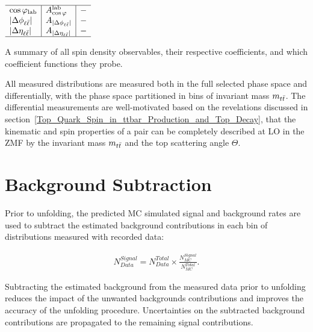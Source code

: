 \begin{table}[htb]
\begin{center}
\begin{adjustbox}{scale=0.85,center}
\begin{math}
\begin{array}{l|l|l}
\hline 
\cos \varphi_{\text {lab}} & A_{\cos \varphi}^{\text {lab}} & - \\
\left\vert\Delta \phi_{\ell \bar{\ell}}\right\vert & A_{\vert \Delta \phi_{\ell \bar{\ell}}\vert} & - \\
\left\vert\Delta \eta_{\ell \bar{\ell}}\right\vert & A_{\vert \Delta \eta_{\ell \bar{\ell}}\vert} & - \\
\hline
\end{array}
\end{math}
\end{adjustbox}
\caption{A summary of all spin density observables, their respective coefficients, and which coefficient functions they probe. 
        }
\label{observables_coefficients}
\end{center}
\end{table}
All measured distributions are measured both in the full selected phase space and differentially, with the phase space partitioned in bins of \ttbar invariant mass $m_{t\bar{t}}$.
The differential measurements are well-motivated based on the revelations discussed in section~\ref{Top_Quark_Spin_in_ttbar_Production_and_Top_Decay}, that the kinematic and spin properties of a \ttbar pair can be completely described at LO in the \ttbar ZMF by the invariant mass $m_{t\bar{t}}$ and the top scattering angle $\Theta$.

\clearpage
\section{Background Subtraction}
\label{Background_Subtraction}
Prior to unfolding, the predicted MC simulated signal and background rates are used to subtract the estimated background contributions in each bin of distributions measured with recorded data:
\begin{linenomath*}
\begin{align}
N^{Signal}_{Data} = N^{Total}_{Data} \times \frac{N^{Signal}_{MC}}{N^{Total}_{MC}}.
\label{Data_Background_Subtraction}
\end{align}
\end{linenomath*}
Subtracting the estimated background from the measured data prior to unfolding reduces the impact of the unwanted backgrounds contributions and improves the accuracy of the unfolding procedure.
Uncertainties on the subtracted background contributions are propagated to the remaining signal contributions.

